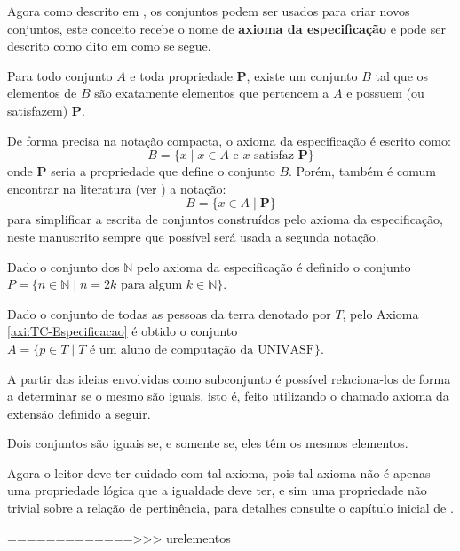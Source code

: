 Agora como descrito em \cite{carmo2013}, os conjuntos podem ser usados para criar novos conjuntos, este conceito recebe o nome de \textbf{axioma da especificação} e pode ser descrito como dito em \cite{halmos2001} como se segue. 

\begin{axioma}\label{axi:TC-Especificacao}
	\cite{halmos2001} Para todo conjunto $A$ e toda propriedade $\textbf{P}$, existe um conjunto $B$ tal que os elementos de $B$ são exatamente elementos que pertencem a $A$ e possuem (ou satisfazem) $\textbf{P}.$
\end{axioma}

De forma precisa na notação compacta, o axioma da especificação é escrito como: 
$$B = \{x \mid x \in A \mbox{ e } x \mbox{ satisfaz } \textbf{P}\}$$ 
onde $\textbf{P}$ seria a propriedade que define o conjunto $B$. Porém, também é comum encontrar na literatura (ver \cite{halmos2001}) a notação:
$$B = \{x \in A \mid \textbf{P}\}$$
para simplificar a escrita de conjuntos construídos pelo axioma da especificação, neste manuscrito sempre que possível será usada a segunda notação.

\begin{exem}
	Dado o conjunto dos $\mathbb{N}$ pelo axioma da especificação é definido o conjunto $P = \{n \in \mathbb{N} \mid n = 2k \mbox{ para algum } k \in \mathbb{N}\}$.
\end{exem}

\begin{exem}
	Dado o conjunto de todas as pessoas da terra denotado por $T$, pelo Axioma \ref{axi:TC-Especificacao} é obtido o conjunto $A = \{p \in T \mid T \mbox{ é um aluno de computação da UNIVASF}\}$.
\end{exem}



A partir das ideias envolvidas como subconjunto é possível relaciona-los de forma a determinar se o mesmo são iguais, isto é, feito utilizando o chamado axioma da extensão definido a seguir. 

\begin{axioma}\label{axi:TC-Exntesao}
	\cite{halmos2001} Dois conjuntos são iguais se, e somente se, eles têm os mesmos elementos.
\end{axioma}

Agora o leitor deve ter cuidado com tal axioma, pois tal axioma não é apenas uma propriedade lógica que a igualdade deve ter, e sim uma propriedade não trivial sobre a relação de pertinência, para detalhes consulte o capítulo inicial de \cite{halmos2001}.



=============>>>  urelementos 